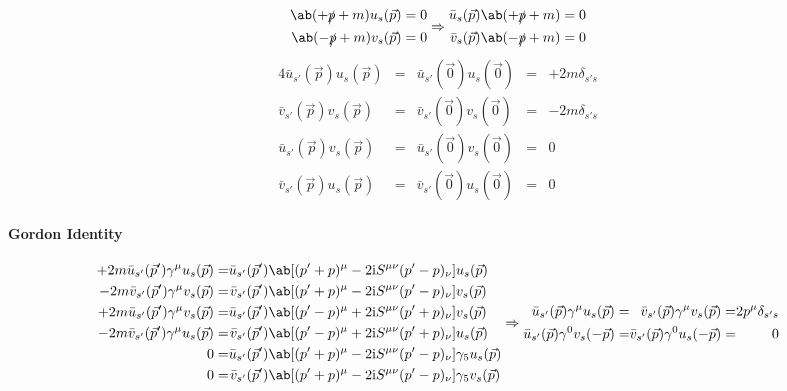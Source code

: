 \documentclass{article}
\newcommand{\gammafive}{\gamma_5}
\newcommand{\gammamu}{\gamma^{\mu}}
\newcommand{\rmi}{\mathrm{i}}
\newcommand{\slashedp}{\slashed{p}}
\newcommand{\Smunu}{S^{\mu\nu}}
\newcommand{\vecp}{\vec{p}}
\begin{document}
\[ \begin{aligned}
        \ab(+ \slashedp + m) u_s(\vecp) = 0 \\
        \ab(- \slashedp + m) v_s(\vecp) = 0
    \end{aligned} \Rightarrow \begin{aligned}
        \bar{u}_s(\vecp) \ab(+ \slashedp + m) = 0 \\
        \bar{v}_s(\vecp) \ab(- \slashedp + m) = 0
    \end{aligned} \]
\begin{alignat*}{4}
    \bar{u}_{s'}(\vecp) u_{s}(\vecp) & = & \bar{u}_{s'}(\vec{0}) u_{s}(\vec{0}) & = & + 2 m \delta_{s's} \\
    \bar{v}_{s'}(\vecp) v_{s}(\vecp) & = & \bar{v}_{s'}(\vec{0}) v_{s}(\vec{0}) & = & - 2 m \delta_{s's} \\
    \bar{u}_{s'}(\vecp) v_{s}(\vecp) & = & \bar{u}_{s'}(\vec{0}) v_{s}(\vec{0}) & = & 0                  \\
    \bar{v}_{s'}(\vecp) u_{s}(\vecp) & = & \bar{v}_{s'}(\vec{0}) u_{s}(\vec{0}) & = & 0
\end{alignat*}

\paragraph{Gordon Identity}

\[ \begin{alignedat}{3}
        + 2 m \bar{u}_{s'}(\vecp') \gammamu u_{s}(\vecp) & = & \bar{u}_{s'}(\vecp') & \ab[(p' + p)^{\mu} - 2 \rmi \Smunu (p' - p)_{\nu}] u_{s}(\vecp)            \\
        - 2 m \bar{v}_{s'}(\vecp') \gammamu v_{s}(\vecp) & = & \bar{v}_{s'}(\vecp') & \ab[(p' + p)^{\mu} - 2 \rmi \Smunu (p' - p)_{\nu}] v_{s}(\vecp)            \\
        + 2 m \bar{u}_{s'}(\vecp') \gammamu v_{s}(\vecp) & = & \bar{u}_{s'}(\vecp') & \ab[(p' - p)^{\mu} + 2 \rmi \Smunu (p' + p)_{\nu}] v_{s}(\vecp)            \\
        - 2 m \bar{v}_{s'}(\vecp') \gammamu u_{s}(\vecp) & = & \bar{v}_{s'}(\vecp') & \ab[(p' - p)^{\mu} + 2 \rmi \Smunu (p' + p)_{\nu}] u_{s}(\vecp)            \\
        0                                                    & = & \bar{u}_{s'}(\vecp') & \ab[(p' + p)^{\mu} - 2 \rmi \Smunu (p' - p)_{\nu}] \gammafive u_{s}(\vecp) \\
        0                                                    & = & \bar{v}_{s'}(\vecp') & \ab[(p' + p)^{\mu} - 2 \rmi \Smunu (p' - p)_{\nu}] \gammafive v_{s}(\vecp)
    \end{alignedat} \Rightarrow \begin{alignedat}{8}
        \bar{u}_{s'}(\vecp) \gammamu u_s(\vecp)   & = & \bar{v}_{s'}(\vecp) \gammamu v_s(\vecp) & = & 2 p^{\mu} \delta_{s's} \\
        \bar{u}_{s'}(\vecp) \gamma^0 v_s(- \vecp) & = & \bar{v}_{s'}(\vecp) \gamma^0 u_s(- \vecp) & = & 0
    \end{alignedat} \]
\end{document}
